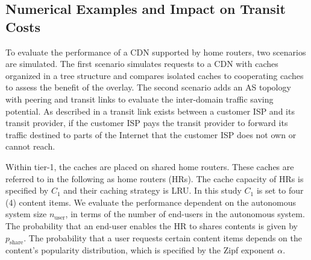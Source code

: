 \subsection{Numerical Examples and Impact on Transit Costs}\label{sec:hierarchical:simulative:evaluation}

To evaluate the performance of a CDN supported by home routers, two scenarios are simulated. The first scenario simulates requests to a CDN with caches organized in a tree structure and compares isolated caches to cooperating caches to assess the benefit of the overlay.
The second scenario adds an AS topology with peering and transit links to evaluate the inter-domain traffic saving potential.
As described in  a transit link exists between a customer ISP and its transit provider, if the customer ISP pays the transit provider to forward its traffic destined to parts of the Internet that the customer ISP does not own or cannot reach.

Within tier-1, the caches are placed on shared home routers. These caches are referred to in the following as home routers (HRs). The cache capacity of HRs is specified by $C_1$ and their caching strategy is LRU. In this study $C_1$ is set to four (4) content items.
We evaluate the performance dependent on the autonomous system size $n_\text{user}$, in terms of the number of end-users in the autonomous system. The probability that an end-user enables the HR to shares contents is given by $p_\text{share}$. The probability that a user requests certain content items depends on the content's popularity distribution, which is specified by the Zipf exponent $\alpha$.

